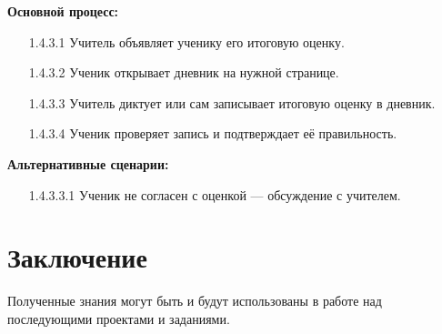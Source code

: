 \documentclass[a4paper, final]{article}
\begin{document}
\textbf{Основной процесс:}
\begin{enumerate}
  \item[1.4.3.1] Учитель объявляет ученику его итоговую оценку.
  \item[1.4.3.2] Ученик открывает дневник на нужной странице.
  \item[1.4.3.3] Учитель диктует или сам записывает итоговую оценку в дневник.
  \item[1.4.3.4] Ученик проверяет запись и подтверждает её правильность.
\end{enumerate}

\textbf{Альтернативные сценарии:}
\begin{itemize}
  \item[1.4.3.3.1] Ученик не согласен с оценкой --- обсуждение с учителем.
\end{itemize}

\newpage
\section*{Заключение}
Полученные знания могут быть и будут использованы в работе над последующими проектами и заданиями.

\cleardoublepage
{}
\newpage
\begin{thebibliography}{0}
\end{thebibliography}
\end{document}
